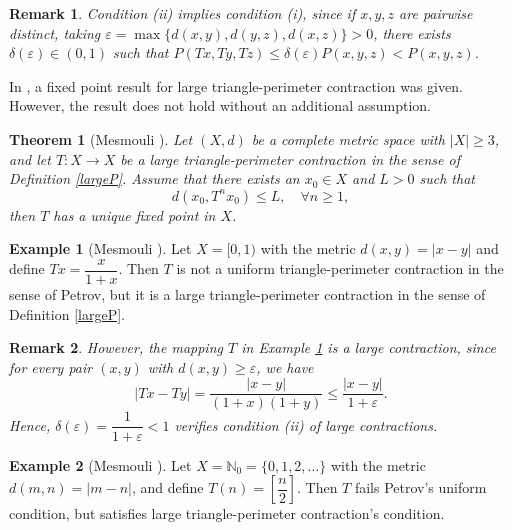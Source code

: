 \documentclass[12 pt]{article}
\theoremstyle{lema}
\theoremstyle{proposition}
\theoremstyle{theorem}
\newtheorem{theorem}{Theorem}[section]
\theoremstyle{theorem}
\newtheorem{remark}{Remark}[section]
\theoremstyle{corollary}
\theoremstyle{definition}
\theoremstyle{example}
\newtheorem{example}{Example}[section]
\def\n{\mathbb N}
\begin{document}
	\begin{remark}
		Condition (ii) implies condition (i), since if $x,y,z$ are pairwise distinct, taking \(\varepsilon = \max\{d(x,y), d(y,z), d(x,z)\} > 0\), there exists \(\delta(\varepsilon) \in (0,1)\) such that \(P(Tx,Ty,Tz) \leq \delta(\varepsilon)  P(x,y,z) < P(x,y,z)\).
	\end{remark}

	In \cite{Mesmouli}, a fixed point result for large triangle-perimeter contraction was given. However, the result does not hold without an additional assumption.

	\begin{theorem}[Mesmouli \cite{Mesmouli}]
		Let $(X,d)$ be a complete metric space with  $|X|\geq 3$, and let $T \colon X\to X$ be a large triangle-perimeter contraction in the sense of Definition \ref{largeP}. Assume that there exists an $x_0 \in X$ and $L > 0$ such that 
		\[ d(x_0,T^nx_0) \leq L, \quad \forall n \geq 1,\]
		then $T$ has a unique fixed point in \(X\).
	\end{theorem}

	\begin{example}[Mesmouli \cite{Mesmouli}]
		Let \(X=[0,1)\) with the metric \(d(x,y)=|x-y|\) and define \(Tx= \dfrac x{1+x}\). Then \(T\) is not a uniform triangle-perimeter contraction in the sense of Petrov, but it is a large triangle-perimeter contraction in the sense of Definition \ref{largeP}.
		\label{Ex2.1}
	\end{example}
	
	\begin{remark}
		However, the mapping \(T\) in Example \ref{Ex2.1} is a large contraction, since for every pair \((x,y)\) with \(d(x,y) \geq \varepsilon\), we have
		\[|Tx-Ty| = \dfrac{|x-y|}{(1+x)(1+y)} \leq \dfrac{|x-y|}{1+\varepsilon}. \]
		Hence, \(\delta(\varepsilon) = \dfrac{1}{1+\varepsilon} < 1\) verifies condition (ii) of large contractions.
	\end{remark}

	\begin{example}[Mesmouli \cite{Mesmouli}]
		Let \(X=\n_0=\{0,1,2, \dots\}\) with the metric \(d(m,n)=|m-n|\), and define \(T(n)= \left[\dfrac{n}{2}\right]\). Then \(T\) fails Petrov's uniform condition, but satisfies large triangle-perimeter contraction's condition.
		\label{Ex2.2}
	\end{example}
\end{document}
